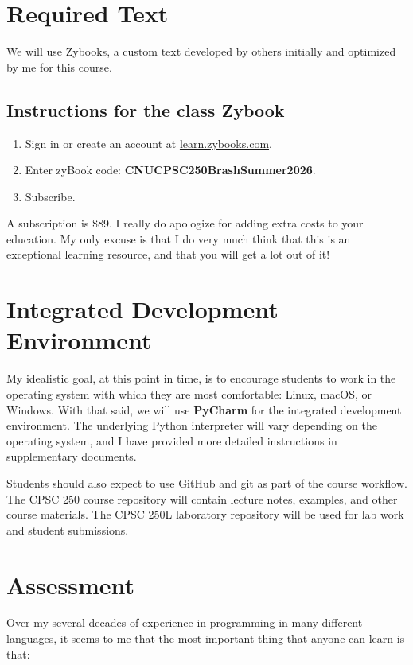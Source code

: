 \documentclass[11pt]{article}
\newcommand{\zybookcode}{CNUCPSC250BrashSummer2026}
\begin{document}
\section{Required Text}

We will use Zybooks, a custom text developed by others initially and optimized by me for this course.

\subsection*{Instructions for the class Zybook}

\begin{enumerate}
    \item Sign in or create an account at \href{https://learn.zybooks.com}{learn.zybooks.com}.
    \item Enter zyBook code: \textbf{\zybookcode}.
    \item Subscribe.
\end{enumerate}

A subscription is \$89. I really do apologize for adding extra costs to your education. My only excuse is that I do very much think that this is an exceptional learning resource, and that you will get a lot out of it!

\section{Integrated Development Environment}

My idealistic goal, at this point in time, is to encourage students to work in the operating system with which they are most comfortable: Linux, macOS, or Windows. With that said, we will use \textbf{PyCharm} for the integrated development environment. The underlying Python interpreter will vary depending on the operating system, and I have provided more detailed instructions in supplementary documents.

Students should also expect to use GitHub and git as part of the course workflow. The CPSC 250 course repository will contain lecture notes, examples, and other course materials. The CPSC 250L laboratory repository will be used for lab work and student submissions.

\section{Assessment}

Over my several decades of experience in programming in many different languages, it seems to me that the most important thing that anyone can learn is that:
\end{document}
